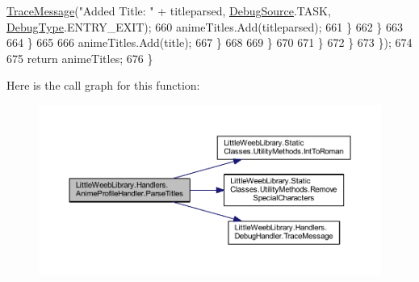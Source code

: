 \begin{DoxyCode}
      \mbox{\hyperlink{interface_little_weeb_library_1_1_handlers_1_1_i_debug_handler_a2e405bc3492e683cd3702fae125221bc}{TraceMessage}}(\textcolor{stringliteral}{"Added Title: "} + titleparsed, \mbox{\hyperlink{namespace_little_weeb_library_1_1_handlers_a2a6ca0775121c9c503d58aa254d292be}{DebugSource}}.TASK, 
      \mbox{\hyperlink{namespace_little_weeb_library_1_1_handlers_ab66019ed40462876ec4e61bb3ccb0a62}{DebugType}}.ENTRY\_EXIT);
660                                             animeTitles.Add(titleparsed);
661                                         \}
662                                     \}
663 
664                                 \}
665 
666                                 animeTitles.Add(title);
667                             \}
668 
669                         \}
670                        
671                     \}
672                 \}
673             \});          
674 
675             \textcolor{keywordflow}{return} animeTitles;
676         \}
\end{DoxyCode}
Here is the call graph for this function\+:\nopagebreak
\begin{figure}[H]
\begin{center}
\leavevmode
\includegraphics[width=350pt]{class_little_weeb_library_1_1_handlers_1_1_anime_profile_handler_a4796da2a058bbc1efe2ee8f31b6a9b4d_cgraph}
\end{center}
\end{figure}
\mbox{\label{class_little_weeb_library_1_1_handlers_1_1_anime_profile_handler_a92412693abdf9ea697e6b793b71d468f}} 
